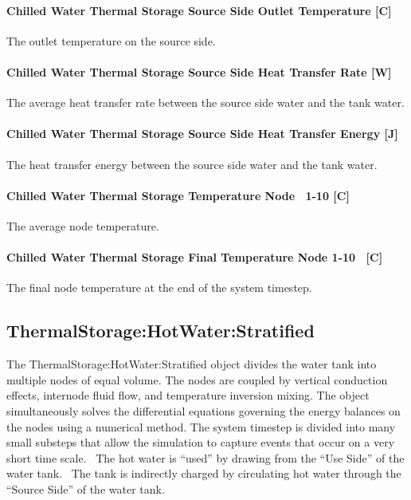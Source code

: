 \paragraph{Chilled Water Thermal Storage Source Side Outlet Temperature {[}C{]}}\label{chilled-water-thermal-storage-source-side-outlet-temperature-c-1}

The outlet temperature on the source side.

\paragraph{Chilled Water Thermal Storage Source Side Heat Transfer Rate {[}W{]}}\label{chilled-water-thermal-storage-source-side-heat-transfer-rate-w-1}

The average heat transfer rate between the source side water and the tank water.

\paragraph{Chilled Water Thermal Storage Source Side Heat Transfer Energy {[}J{]}}\label{chilled-water-thermal-storage-source-side-heat-transfer-energy-j-1}

The heat transfer energy between the source side water and the tank water.

\paragraph{Chilled Water Thermal Storage Temperature Node~ 1-10 {[}C{]}}\label{chilled-water-thermal-storage-temperature-node-1-10-c}

The average node temperature.

\paragraph{Chilled Water Thermal Storage Final Temperature Node 1-10~ {[}C{]}}\label{chilled-water-thermal-storage-final-temperature-node-1-10-c}

The final node temperature at the end of the system timestep.

\subsection{ThermalStorage:HotWater:Stratified}\label{thermalstoragehotwaterstratified}

The ThermalStorage:HotWater:Stratified object divides the water tank into
multiple nodes of equal volume. The nodes are coupled by vertical conduction
effects, internode fluid flow, and temperature inversion mixing. The object
simultaneously solves the differential equations governing the energy balances
on the nodes using a numerical method. The system timestep is divided into many
small substeps that allow the simulation to capture events that occur on a very
short time scale.~ The hot water is ``used'' by drawing from the ``Use Side'' of
the water tank.~ The tank is indirectly charged by circulating hot water through
the ``Source Side'' of the water tank.

